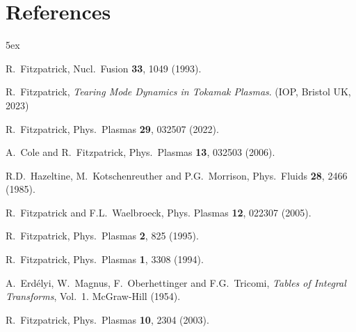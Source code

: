 \documentclass[12pt,prb,aps,notitlepage]{revtex4-1}
\begin{document}
\section*{References}
\begin{thebibliography}{99}\baselineskip 5ex

 R.~Fitzpatrick, Nucl.\ Fusion {\bf 33}, 1049 (1993).

 R.~Fitzpatrick, {\em Tearing Mode Dynamics in Tokamak Plasmas}. (IOP, Bristol UK,  2023)

 R.~Fitzpatrick, Phys.\ Plasmas {\bf 29}, 032507 (2022).

 A.~Cole and R.~Fitzpatrick, Phys.\ Plasmas {\bf 13}, 032503 (2006).

 R.D.~Hazeltine, M.~Kotschenreuther and P.G.~Morrison, Phys.\ Fluids {\bf 28}, 2466 (1985).

 R.~Fitzpatrick and F.L.~Waelbroeck, Phys. Plasmas {\bf 12}, 022307 (2005).

 R.~Fitzpatrick, Phys.\ Plasmas {\bf 2}, 825 (1995).

 R.~Fitzpatrick, Phys.\ Plasmas {\bf 1}, 3308 (1994).

 A.~Erd\'{e}lyi, W.~Magnus, F.~Oberhettinger and F.G.~Tricomi, {\em Tables of Integral Transforms}, Vol.~1. McGraw-Hill (1954).

 R.~Fitzpatrick, Phys.\ Plasmas {\bf 10}, 2304 (2003).

\end{thebibliography}
\end{document}
